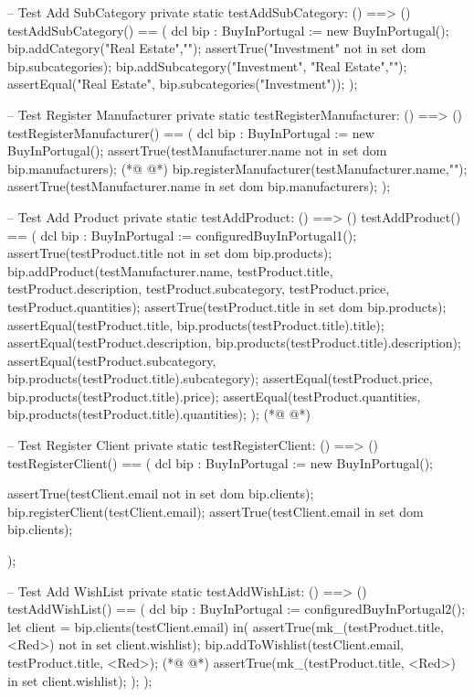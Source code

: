 \begin{vdmpp}[breaklines=true]
 -- Test Add SubCategory
 private static testAddSubCategory: () ==> ()
 testAddSubCategory() == (
  dcl bip : BuyInPortugal := new BuyInPortugal();
  bip.addCategory("Real Estate","");
  assertTrue("Investment" not in set dom bip.subcategories);
  bip.addSubcategory("Investment", "Real Estate","");
   assertEqual("Real Estate", bip.subcategories("Investment"));
 );
 
 -- Test Register Manufacturer
 private static testRegisterManufacturer: () ==> ()
 testRegisterManufacturer() == (
  dcl bip : BuyInPortugal := new BuyInPortugal();
  assertTrue(testManufacturer.name not in set dom bip.manufacturers);
(*@
\label{testAddToStock:211}
@*)
  bip.registerManufacturer(testManufacturer.name,"");
  assertTrue(testManufacturer.name in set dom bip.manufacturers);
 );
 
 -- Test Add Product
 private static testAddProduct: () ==> ()
 testAddProduct() == (
  dcl bip : BuyInPortugal := configuredBuyInPortugal1();
  assertTrue(testProduct.title not in set dom bip.products);
  bip.addProduct(testManufacturer.name, testProduct.title, testProduct.description, testProduct.subcategory, testProduct.price, testProduct.quantities);
   assertTrue(testProduct.title in set dom bip.products);
   assertEqual(testProduct.title, bip.products(testProduct.title).title);
   assertEqual(testProduct.description, bip.products(testProduct.title).description);
   assertEqual(testProduct.subcategory, bip.products(testProduct.title).subcategory);
   assertEqual(testProduct.price, bip.products(testProduct.title).price);
   assertEqual(testProduct.quantities, bip.products(testProduct.title).quantities);
 );
(*@
\label{testRemoveWishList:228}
@*)
 
 -- Test Register Client
 private static testRegisterClient: () ==> ()
 testRegisterClient() == (
  dcl bip : BuyInPortugal := new BuyInPortugal();
  
  assertTrue(testClient.email not in set dom bip.clients);
  bip.registerClient(testClient.email);
  assertTrue(testClient.email in set dom bip.clients);
   
 );
 
 -- Test Add WishList
 private static testAddWishList: () ==> ()
 testAddWishList() == (
  dcl bip : BuyInPortugal := configuredBuyInPortugal2();
  let client = bip.clients(testClient.email)
  in(
   assertTrue(mk_(testProduct.title, <Red>) not in set client.wishlist);
   bip.addToWishlist(testClient.email, testProduct.title, <Red>);
(*@
\label{testAddToCart:248}
@*)
   assertTrue(mk_(testProduct.title, <Red>) in set client.wishlist);
  );
 );
 

\end{vdmpp}

